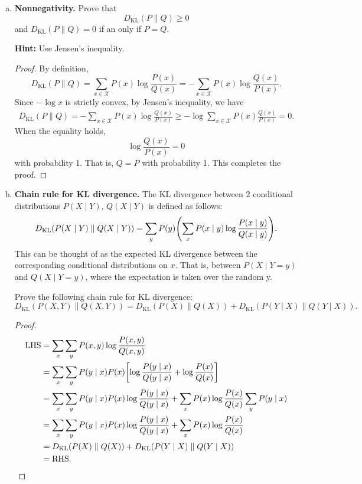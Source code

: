 \documentclass[12pt,letterpaper,boxed]{hmcpset}
\newcommand{\DKL}[2]{D_{\mathrm{KL}}(#1 \parallel #2)}
\begin{document}
\begin{solution}
  \begin{enumerate}[(a)]
    \item \textbf{Nonnegativity.} Prove that 
    \[
    \DKL{P}{Q} \geq 0 
    \]
    and $\DKL{P}{Q} = 0$ if an only if $P = Q$.
    
    \textbf{Hint:} Use Jensen's inequality.
    
    \begin{proof}
      By definition,
      \[
        \DKL{P}{Q} = \sum_{x \in \mathcal{X}} P(x) \log \frac{P(x)}{Q(x)} = - \sum_{x \in \mathcal{X}} P(x) \log \frac{Q(x)}{P(x)}.
      \] 
      Since $-\log x$ is strictly convex, by Jensen's inequality, we have
      \[
      \begin{aligned}
        \DKL{P}{Q} = - \sum_{x \in \mathcal{X}} P(x) \log \frac{Q(x)}{P(x)}
        \geq -\log \sum_{x \in \mathcal{X}} P(x) \frac{Q(x)}{P(x)} = 0.
      \end{aligned}
      \]
      When the equality holds, 
      \[
      \log \frac{Q(x)}{P(x)} = 0
      \]
      with probability 1. That is, $Q = P$ with probability 1. This completes the proof.
    \end{proof}
    
    \item \textbf{Chain rule for KL divergence.} The KL divergence between 2 conditional distributions $P(X \mid Y)$, $Q(X \mid Y)$ is defined as follows:
    \[
    \DKL{P(X \mid Y)}{Q(X \mid Y)} = \sum_y P(y) \qty(\sum_x P(x \mid y) \log \frac{P(x \mid y)}{Q(x \mid y)}).
    \]
    This can be thought of as the expected KL divergence between the corresponding conditional distributions on $x$. That is, between $P(X \mid Y = y)$ and $Q(X \mid Y = y)$, where the expectation is taken over the random y.

    Prove the following chain rule for KL divergence:
    \[
      \DKL{P(X, Y)}{Q(X, Y)} = \DKL{P(X)}{Q(X)} + \DKL{P(Y \mid X)}{Q(Y \mid X)}.
    \]
    \begin{proof}
      \[
      \begin{aligned}
        \text{LHS} &= \sum_x \sum_y P(x,y) \log \frac{P(x,y)}{Q(x,y)} \\
        &= \sum_x \sum_y P(y \mid x) P(x) \qty[\log \frac{P(y \mid x)}{Q(y \mid x)} + \log \frac{P(x)}{Q(x)}] \\
        &= \sum_x \sum_y P(y \mid x) P(x) \log \frac{P(y \mid x)}{Q(y \mid x)} + \sum_x P(x) \log \frac{P(x)}{Q(x)} \sum_y P(y \mid x) \\
        &= \sum_x \sum_y P(y \mid x) P(x) \log \frac{P(y \mid x)}{Q(y \mid x)} + \sum_x P(x) \log \frac{P(x)}{Q(x)} \\
        &= \DKL{P(X)}{Q(X)} + \DKL{P(Y \mid X)}{Q(Y \mid X)} \\
        &= \text{RHS}.
      \end{aligned}
      \]
    \end{proof}


\end{enumerate}
\end{solution}
\end{document}
